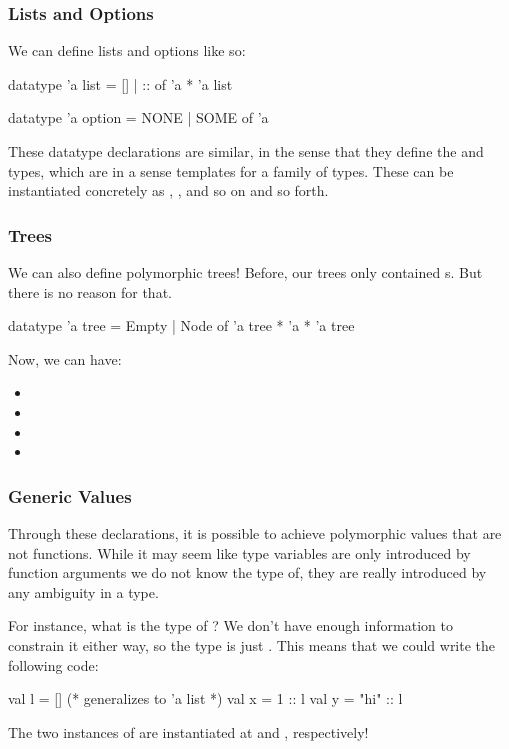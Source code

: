 \documentclass[aspectratio=169]{beamer}
\begin{document}
\begin{frame}[fragile]
  \frametitle{Lists and Options}

  We can define lists and options like so:

  \begin{codeblock}
    datatype 'a list = [] | :: of 'a * 'a list

    datatype 'a option = NONE | SOME of 'a
  \end{codeblock}

  These datatype declarations are similar, in the sense that they define the
   and  types, which are in a sense templates for
  a family of types. These can be instantiated concretely as ,
  , and so on and so forth.

\end{frame}

\begin{frame}[fragile]
  \frametitle{Trees}

  We can also define polymorphic trees! Before, our trees only contained s.
  But there is no reason for that.

  \begin{codeblock}
    datatype 'a tree = Empty | Node of 'a tree * 'a * 'a tree 
  \end{codeblock}

  Now, we can have:
  \begin{itemize}
    \item {}  
    \item {}  
    \item {}  
    \item {}  
  \end{itemize}
\end{frame}

\begin{frame}[fragile]
  \frametitle{Generic Values}

  Through these declarations, it is possible to achieve polymorphic values that
  are not functions. While it may seem like type variables are only introduced
  by function arguments we do not know the type of, they are really introduced by
  any ambiguity in a type.

  For instance, what is the type of \code{[]}? We don't have enough information 
  to constrain it either way, so the type is just . This means that
  we could write the following code: 

  \begin{codeblock}
    val l = [] (* generalizes to 'a list *)
    val x = 1 :: l
    val y = "hi" :: l
  \end{codeblock}

  The two instances of  are instantiated at  and 
  , respectively!
\end{frame}
\end{document}

